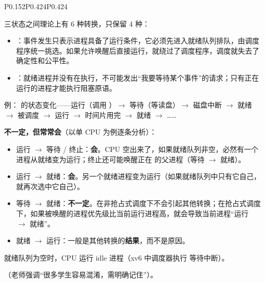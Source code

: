 \begin{btab}{P{0.152}P{0.424}P{0.424}}
\end{btab}
三状态之间理论上有 6 种转换，只保留 4 种：
\begin{itemize}
    \item {}：事件发生只表示进程具备了运行条件，它必须先进入就绪队列排队，由调度程序统一挑选。如果允许唤醒后直接运行，就绕过了调度程序，调度就失去了确定性和公平性。
    \item {}：就绪进程并没有在执行，不可能发出“我要等待某个事件”的请求；只有正在运行的进程才能执行阻塞原语。
\end{itemize}
例： 的状态变化——运行（调用 ）$\to$ 等待（等读盘）$\to$ 磁盘中断 $\to$ 就绪 $\to$ 被调度 $\to$ 运行 $\to$ 时间片用完 $\to$ 就绪 $\to$ ……

\textbf{不一定，但常常会}（以单 CPU 为例逐条分析）：
\begin{itemize}
    \item 运行 $\to$ 等待 / 终止：\textbf{会}。CPU 空出来了，如果就绪队列非空，必然有一个进程从就绪变为运行；终止还可能唤醒正在  的父进程（等待 $\to$ 就绪）。
    \item 运行 $\to$ 就绪：\textbf{会}。另一个就绪进程变为运行（如果就绪队列中只有它自己，就再次选中它自己）。
    \item 等待 $\to$ 就绪：\textbf{不一定}。在非抢占式调度下不会引起其他转换；在抢占式调度下，如果被唤醒的进程优先级比当前运行进程高，就会导致当前进程“运行 $\to$ 就绪”。
    \item 就绪 $\to$ 运行：一般是其他转换的\textbf{结果}，而不是原因。
\end{itemize}
就绪队列为空时，CPU 运行 idle 进程（xv6 中调度器执行  等待中断）。

（老师强调“很多学生容易混淆，需明确记住”）。


